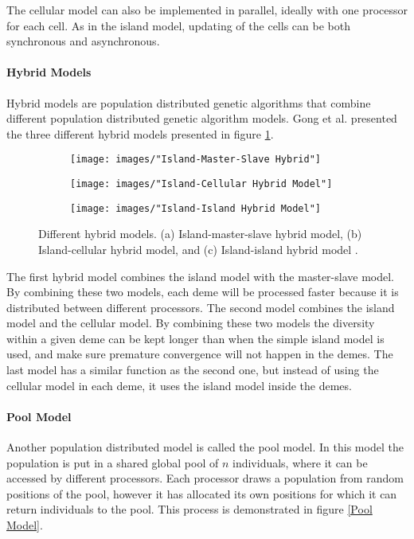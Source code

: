 \noindent The cellular model can also be implemented in parallel, ideally with one processor for each cell. As in the island model, updating of the cells can be both synchronous and asynchronous. 


\paragraph*{Hybrid Models}
Hybrid models are population distributed genetic algorithms that combine different population distributed genetic algorithm models. Gong et al. presented the three different hybrid models presented in figure \ref{Hybrid Models}.\\


\begin{figure}[h!]
    \centering
    \begin{subfigure}[b]{0.3\textwidth}
        \texttt{[image: images/"Island-Master-Slave Hybrid"]}
        \caption{}
    \end{subfigure}
    \begin{subfigure}[b]{0.3\textwidth}
        \texttt{[image: images/"Island-Cellular Hybrid Model"]}
        \caption{}
    \end{subfigure}
    \begin{subfigure}[b]{0.3\textwidth}
        \texttt{[image: images/"Island-Island Hybrid Model"]}
        \caption{}
    \end{subfigure}
    \caption{Different hybrid models. (a) Island-master-slave hybrid model, (b) Island-cellular hybrid model, and (c) Island-island hybrid model \citep{Gong}.}
    \label{Hybrid Models}
\end{figure}


\noindent The first hybrid model combines the island model with the master-slave model. By combining these two models, each deme will be processed faster because it is distributed between different processors. The second model combines the island model and the cellular model. By combining these two models the diversity within a given deme can be kept longer than when the simple island model is used, and make sure premature convergence will not happen in the demes. The last model has a similar function as the second one, but instead of using the cellular model in each deme, it uses the island model inside the demes. \\


\paragraph*{Pool Model}
Another population distributed model is called the pool model. In this model the population is put in a shared global pool of $n$ individuals, where it can be accessed by different processors. Each processor draws a population from random positions of the pool, however it has allocated its own positions for which it can return individuals to the pool. This process is demonstrated in figure \ref{Pool Model}. \\


